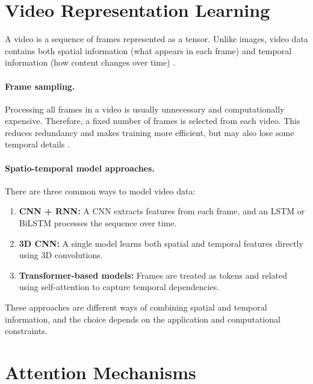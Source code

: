 \section{Video Representation Learning}\label{sec:bg:video}

A video is a sequence of frames represented as a tensor. Unlike images, video data contains both spatial information (what appears in each frame) and temporal information (how content changes over time) \cite{asaju_adaptive_2022,mehta_three-dimensional_2022,abedi_improving_2021}.

\paragraph{Frame sampling.}
Processing all frames in a video is usually unnecessary and computationally expensive. Therefore, a fixed number of frames is selected from each video. This reduces redundancy and makes training more efficient, but may also lose some temporal details \cite{abedi_improving_2021,asaju_adaptive_2022}.

\paragraph{Spatio-temporal model approaches.}
There are three common ways to model video data:

\begin{enumerate}
  \item \textbf{\ac{CNN} + RNN:} A \ac{CNN} extracts features from each frame, and an \ac{LSTM} or \ac{BiLSTM} processes the sequence over time.
  \item \textbf{3D \ac{CNN}:} A single model learns both spatial and temporal features directly using 3D convolutions.
  \item \textbf{Transformer-based models:} Frames are treated as tokens and related using self-attention to capture temporal dependencies.
\end{enumerate}

These approaches are different ways of combining spatial and temporal information, and the choice depends on the application and computational constraints.

\section{Attention Mechanisms}\label{sec:bg:attention}

